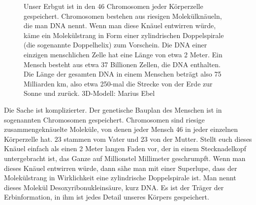 \documentclass[fontsize=14pt,a4paper,headinclude,DIV=calc,automark]{scrbook}
\begin{document}
\setlength{\fboxsep}{0pt}    %
\setlength{\fboxrule}{0.2pt} %
\begin{figure}[ht]
    \centering
    \caption{Unser Erbgut ist in den 46 Chromosomen jeder Körperzelle gespeichert. Chromosomen bestehen aus riesigen Molekülknäueln, die man DNA nennt. Wenn man diese Knäuel entwirren würde, käme ein Molekülstrang in Form einer zylindrischen Doppelspirale (die sogenannte Doppelhelix) zum Vorschein. Die DNA einer einzigen menschlichen Zelle hat eine Länge von etwa 2 Meter. Ein Mensch besteht aus etwa 37 Billionen Zellen, die DNA enthalten. Die Länge der gesamten DNA in einem Menschen beträgt also 75 Milliarden km, also etwa 250-mal die Strecke von der Erde zur Sonne und zurück. \hfill 3D-Modell: Marius Ebel}
    \label{fig:erbgut}
\end{figure}

Die Sache ist komplizierter. Der genetische Bauplan des Menschen ist in sogenannten Chromosomen gespeichert. Chromosomen sind riesige zusammengeknäuelte Moleküle, von denen jeder Mensch 46 in jeder einzelnen Körperzelle hat. 23 stammen vom Vater und 23 von der Mutter. Stellt euch dieses Knäuel einfach als einen 2 Meter langen Faden vor, der in einem Stecknadelkopf untergebracht ist, das Ganze auf Millionstel Millimeter geschrumpft. Wenn man dieses Knäuel entwirren würde, dann sähe man mit einer Superlupe, dass der Molekülstrang in Wirklichkeit eine zylindrische Doppelspirale ist. Man nennt dieses Molekül Desoxyribonukleinsäure, kurz DNA. Es ist der Träger der Erbinformation, in ihm ist jedes Detail unseres Körpers gespeichert.
\end{document}
